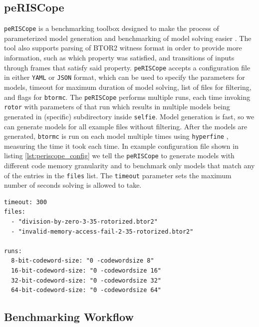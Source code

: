 \documentclass[12pt]{article}
\begin{document}
\subsection{peRISCope}

\texttt{peRISCope} is a benchmarking toolbox designed to make the process of 
parameterized model generation and benchmarking of model solving easier
\cite{Fejzic_peRISCope}. The tool also supports parsing of BTOR2 witness format
in order to provide more information, such as which property was satisfied, and
transitions of inputs through frames that satisfy said property.
\texttt{peRISCope} accepts a configuration file in either \texttt{YAML} or
\texttt{JSON} format, which can be used to specify the parameters for models,
timeout for maximum duration of model solving, list of files for filtering, and
flags for \texttt{btormc}. The \texttt{peRISCope} performs multiple runs,
each time invoking \texttt{rotor} with parameters of that run which results in
multiple models being generated in (specific) subdirectory inside
\texttt{selfie}. Model generation is fast, so we can generate models for all
example files without filtering. After the models are generated,
\texttt{btormc} is run on each model multiple times using \texttt{hyperfine}
\cite{Peter_hyperfine_2023}, measuring the time it took each time. In example
configuration file shown in listing \ref{lst:periscope_config} we tell the
\texttt{peRISCope} to generate models with different code memory granularity
and to benchmark only models that match any of the entries in the
\texttt{files} list. The \texttt{timeout} parameter sets the maximum number of
seconds solving is allowed to take.

\begin{lstlisting}[label=lst:periscope_config, caption={Example peRISCope
                configuration file in \texttt{YAML} format}, captionpos=b]
timeout: 300
files:
  - "division-by-zero-3-35-rotorized.btor2"
  - "invalid-memory-access-fail-2-35-rotorized.btor2"

runs:
  8-bit-codeword-size: "0 -codewordsize 8"
  16-bit-codeword-size: "0 -codewordsize 16"
  32-bit-codeword-size: "0 -codewordsize 32"
  64-bit-codeword-size: "0 -codewordsize 64"
\end{lstlisting}

\subsection{Benchmarking Workflow}
\end{document}
